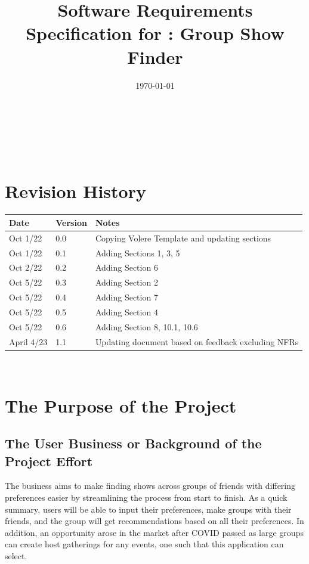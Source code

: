 \documentclass[12pt]{article}
\begin{document}
\title{Software Requirements Specification for \progname: Group Show Finder} 
\author{\authname}
\date{\today}
	
\maketitle
\vspace*{\fill}



~\newpage {}

\tableofcontents

~\newpage

\section*{Revision History}

\begin{tabularx}{\textwidth}{p{3cm}p{2cm}X}
\toprule {\bf Date} & {\bf Version} & {\bf Notes}\\
\midrule
Oct 1/22 & 0.0 & Copying Volere Template and updating sections\\
Oct 1/22 & 0.1 & Adding Sections 1, 3, 5\\
Oct 2/22 & 0.2 & Adding Section 6\\
Oct 5/22 & 0.3 & Adding Section 2\\
Oct 5/22 & 0.4 & Adding Section 7\\
Oct 5/22 & 0.5 & Adding Section 4\\
Oct 5/22 & 0.6 & Adding Section 8, 10.1, 10.6\\
April 4/23 & 1.1 & Updating document based on feedback excluding NFRs\\
\bottomrule
\end{tabularx}

~\newpage {}

\section{The Purpose of the Project}

\subsection{The User Business or Background of the Project Effort}
The business aims to make finding shows across groups of friends with differing preferences easier by streamlining the process from start to finish. As a quick summary, users will be able to input their preferences, make groups with their friends, and the group will get recommendations based on all their preferences. In addition, an opportunity arose in the market after COVID passed as large groups can create host gatherings for any events, one such that this application can select.
\end{document}
